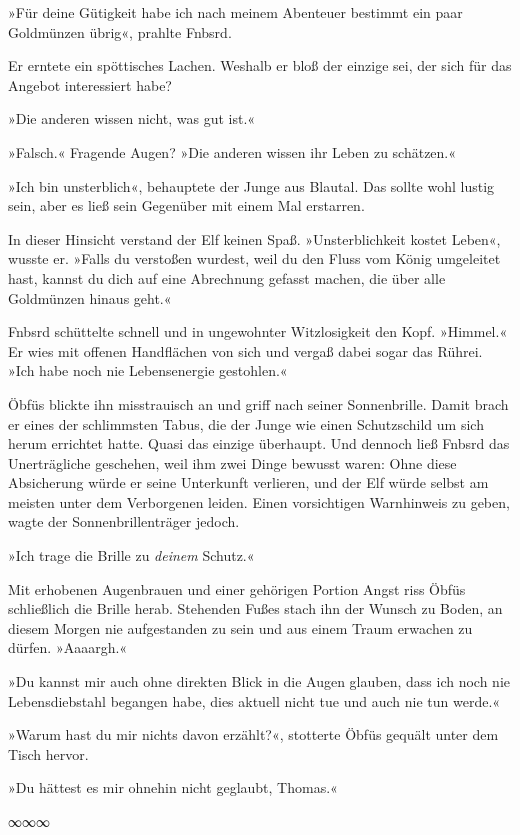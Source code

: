 »Für deine Gütigkeit habe ich nach meinem Abenteuer bestimmt ein paar Goldmünzen übrig«, prahlte Fnbsrd.

Er erntete ein spöttisches Lachen. Weshalb er bloß der einzige sei, der sich für das Angebot interessiert habe?

»Die anderen wissen nicht, was gut ist.«

»Falsch.« Fragende Augen? »Die anderen wissen ihr Leben zu schätzen.«

»Ich bin unsterblich«, behauptete der Junge aus Blautal. Das sollte wohl lustig sein, aber es ließ sein Gegenüber mit einem Mal erstarren.

In dieser Hinsicht verstand der Elf keinen Spaß. »Unsterblichkeit kostet Leben«, wusste er. »Falls du verstoßen wurdest, weil du den Fluss vom König umgeleitet hast, kannst du dich auf eine Abrechnung gefasst machen, die über alle Goldmünzen hinaus geht.«

Fnbsrd schüttelte schnell und in ungewohnter Witzlosigkeit den Kopf. »Himmel.« Er wies mit offenen Handflächen von sich und vergaß dabei sogar das Rührei. »Ich habe noch nie Lebensenergie gestohlen.«

Öbfüs blickte ihn misstrauisch an und griff nach seiner Sonnenbrille. Damit brach er eines der schlimmsten Tabus, die der Junge wie einen Schutzschild um sich herum errichtet hatte. Quasi das einzige überhaupt. Und dennoch ließ Fnbsrd das Unerträgliche geschehen, weil ihm zwei Dinge bewusst waren: Ohne diese Absicherung würde er seine Unterkunft verlieren, und der Elf würde selbst am meisten unter dem Verborgenen leiden. Einen vorsichtigen Warnhinweis zu geben, wagte der Sonnenbrillenträger jedoch.

»Ich trage die Brille zu \emph{deinem} Schutz.«

Mit erhobenen Augenbrauen und einer gehörigen Portion Angst riss Öbfüs schließlich die Brille herab. Stehenden Fußes stach ihn der Wunsch zu Boden, an diesem Morgen nie aufgestanden zu sein und aus einem Traum erwachen zu dürfen. »Aaaargh.«

»Du kannst mir auch ohne direkten Blick in die Augen glauben, dass ich noch nie Lebensdiebstahl begangen habe, dies aktuell nicht tue und auch nie tun werde.«

»Warum hast du mir nichts davon erzählt?«, stotterte Öbfüs gequält unter dem Tisch hervor.

»Du hättest es mir ohnehin nicht geglaubt, Thomas.«

\begin{center}
∞∞∞
\end{center}

